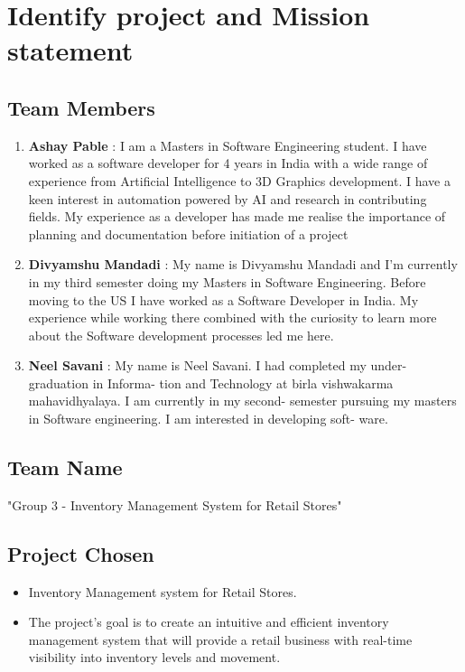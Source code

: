 \chapter{Identify project and Mission statement \\
\label{Chapter::Identify project and Mission statement}}

\section{Team Members \label{Section::teamMembers}}
\begin{enumerate}
  \item \textbf{Ashay Pable} : I am a Masters in Software Engineering student. I have worked as a software
developer for 4 years in India with a wide range of experience from Artificial Intelligence to
3D Graphics development. I have a keen interest in automation powered by AI and research
in contributing fields. My experience as a developer has made me realise the importance of
planning and documentation before initiation of a project
  \item \textbf{Divyamshu Mandadi} : My name is Divyamshu Mandadi and I’m currently in my third
semester doing my Masters in Software Engineering. Before moving to the US I have
worked as a Software Developer in India. My experience while working there combined
with the curiosity to learn more about the Software development processes led me here.
  \item \textbf{Neel Savani} : My name is Neel Savani. I had completed my under-graduation in Informa-
tion and Technology at birla vishwakarma mahavidhyalaya. I am currently in my second-
semester pursuing my masters in Software engineering. I am interested in developing soft-
ware.
\end{enumerate}

\section{Team Name \label{Section::teamName}}
"Group 3 - Inventory Management System for Retail Stores"
\section{Project Chosen \label{Section::projectChosen}}
\begin{itemize}
 \item Inventory Management system for Retail Stores.
 \item The project's goal is to create an intuitive and efficient inventory management system that will provide a retail business with real-time visibility into inventory levels and movement.
\end{itemize}
